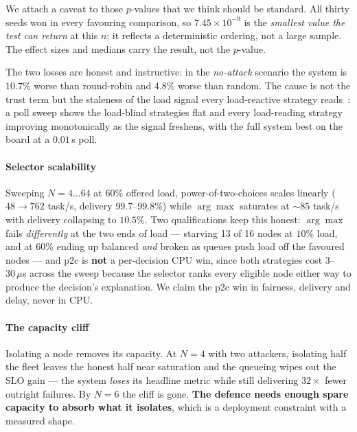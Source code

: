 \documentclass[10pt,twocolumn,letterpaper]{article}
\begin{document}
We attach a caveat to those $p$-values that we think should be standard. All
thirty seeds won in every favouring comparison, so $7.45\times10^{-9}$ is the
\emph{smallest value the test can return} at this $n$; it reflects a
deterministic ordering, not a large sample. The effect sizes and medians carry
the result, not the $p$-value.

The two losses are honest and instructive: in the \emph{no-attack} scenario the
system is $10.7\%$ worse than round-robin and $4.8\%$ worse than random. The
cause is not the trust term but the staleness of the load signal every
load-reactive strategy reads~\cite{mitzenmacher2000old,dahlin2000stale}: a poll
sweep shows the load-blind strategies flat and every load-reading strategy
improving monotonically as the signal freshens, with the full system best on
the board at a $0.01$\,s poll.

\paragraph*{Selector scalability}
Sweeping $N = 4 \ldots 64$ at $60\%$ offered load, power-of-two-choices scales
linearly ($48 \to 762$ task/s, delivery $99.7$--$99.8\%$) while $\arg\max$
saturates at ${\sim}85$ task/s with delivery collapsing to $10.5\%$. Two
qualifications keep this honest: $\arg\max$ fails \emph{differently} at the two
ends of load --- starving 13 of 16 nodes at $10\%$ load, and at $60\%$ ending up
balanced \emph{and} broken as queues push load off the favoured nodes --- and
p2c is \textbf{not} a per-decision CPU win, since both strategies cost
$3$--$30\,\mu$s across the sweep because the selector ranks every eligible node
either way to produce the decision's explanation. We claim the p2c win in
fairness, delivery and delay, never in CPU. 

\paragraph*{The capacity cliff}
Isolating a node removes its capacity. At $N = 4$ with two attackers, isolating
half the fleet leaves the honest half near saturation and the queueing wipes
out the SLO gain --- the system \emph{loses} its headline metric while still
delivering $32\times$ fewer outright failures. By $N = 6$ the cliff is gone.
\textbf{The defence needs enough spare capacity to absorb what it isolates},
which is a deployment constraint with a measured shape.
\end{document}
